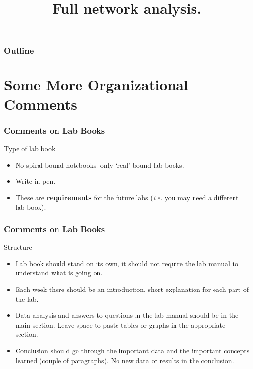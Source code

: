 \documentclass[beamer]{standalone}
\begin{document}
\title[Electronics] %
{
	Full network analysis.
}


\begin{frame} 
\titlepage
\end{frame}

\begin{frame}
\frametitle{Outline}
\tableofcontents
\end{frame}

\section{Some More Organizational Comments}
\begin{frame}
\frametitle{Comments on Lab Books}
\begin{block}{Type of lab book}
 \begin{itemize}
  \item No spiral-bound notebooks, only `real' bound lab books.
  \item Write in pen.
  \item These are \textbf{requirements} for the future labs (\textit{i.e.} you may need a different lab book).
 \end{itemize}
\end{block}
\end{frame}

\begin{frame}
\frametitle{Comments on Lab Books}
\begin{block}{Structure}
 \begin{itemize}
  \item Lab book should stand on its own, it should not require the lab manual to understand what is going on.
  \item Each week there should be an introduction, short explanation for each part of the lab.
  \item Data analysis and answers to questions in the lab manual should be in the main section.  Leave space to paste tables or graphs in the appropriate section.
  \item Conclusion should go through the important data and the important concepts learned (couple of paragraphs).  No new data or results in the conclusion.
 \end{itemize}
\end{block}
\end{frame}
\end{document}
